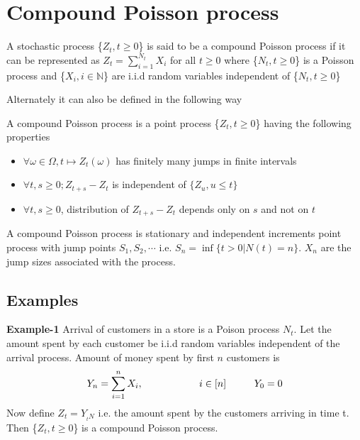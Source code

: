 \documentclass[a4paper,english,12pt]{article}
\begin{document}
\section{Compound Poisson process}
\begin{defn}
A stochastic process \{$Z_t,t \geq 0$\}	 is said to be a compound Poisson process if it can be represented as $Z_t=\sum_{i=1}^{N_t}X_i$ for all $t\geq 0$ where \{$N_t,t\geq 0$\} is a Poisson process and \{$X_i, i\in \mathbb{N}$\} are i.i.d random variables independent of \{$N_t, t\geq 0$\}
\end{defn}
Alternately it can also be defined in the following way
\begin{defn}
A compound Poisson process is a point process \{$Z_t,t \geq 0$\} having the following properties
\begin{itemize}
	\item $\forall \omega \in \Omega, t \longmapsto Z_t(\omega)$ has finitely many jumps in finite intervals
	\item $\forall t,s \geq 0; Z_{t+s}-Z_t$ is independent of $\{Z_u, u\leq t\}$
	\item $\forall t,s \geq 0$, distribution of $Z_{t+s}-Z_t$ depends only on $s$ and not on $t$
\end{itemize}	
\end{defn}
\par A compound Poisson process is stationary and independent increments point process with jump points $S_1,S_2,\cdots$ i.e. $S_n=\inf \{t>0 | N(t)=n\}$. $X_n$ are the jump sizes associated with the process.\\

\subsection{Examples}
\textbf{Example-1 }Arrival of customers in a store is a Poison process $N_t
$. Let the amount spent by each customer be i.i.d random variables independent of the arrival process. Amount of money spent by first $n$ customers is
\begin{equation}
Y_n=\sum_{i=1}^{n}X_i, \hspace{2cm}i \in [n] \hspace{1cm}Y_0=0\\
\end{equation}
Now define $Z_t=Y_{_tN}$ i.e. the amount spent by the customers arriving in time t. Then \{$Z_t,t\geq 0$\} is a compound Poisson process.\\
\end{document}
